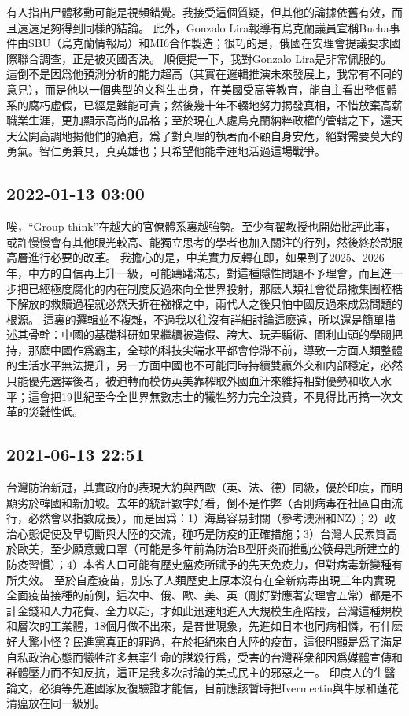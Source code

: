 \documentclass[twocolumn]{ctexart}
\begin{document}
有人指出尸體移動可能是視頻錯覺。我接受這個質疑，但其他的論據依舊有效，而且遠遠足夠得到同樣的結論。
此外，Gonzalo Lira報導有烏克蘭議員宣稱Bucha事件由SBU（烏克蘭情報局）和MI6合作製造；很巧的是，俄國在安理會提議要求國際聯合調查，正是被英國否決。
順便提一下，我對Gonzalo Lira是非常佩服的。這倒不是因爲他預測分析的能力超高（其實在邏輯推演未來發展上，我常有不同的意見），而是他以一個典型的文科生出身，在美國受高等教育，能自主看出整個體系的腐朽虛假，已經是難能可貴；然後幾十年不輟地努力揭發真相，不惜放棄高薪職業生涯，更加顯示高尚的品格；至於現在人處烏克蘭納粹政權的管轄之下，還天天公開高調地揭他們的瘡疤，爲了對真理的執著而不顧自身安危，絕對需要莫大的勇氣。智仁勇兼具，真英雄也；只希望他能幸運地活過這場戰爭。
\subsection*{2022-01-13 03:00}

唉，“Group think”在越大的官僚體系裏越強勢。至少有翟教授也開始批評此事，或許慢慢會有其他眼光較高、能獨立思考的學者也加入關注的行列，然後終於説服高層進行必要的改革。
我擔心的是，中美實力反轉在即，如果到了2025、2026年，中方的自信再上升一級，可能躊躇滿志，對這種隱性問題不予理會，而且進一步把已經極度腐化的内在制度反過來向全世界投射，那麽人類社會從昂撒集團桎梏下解放的救贖過程就必然夭折在襁褓之中，兩代人之後只怕中國反過來成爲問題的根源。
這裏的邏輯並不複雜，不過我以往沒有詳細討論這麽遠，所以還是簡單描述其骨幹：中國的基礎科研如果繼續被造假、誇大、玩弄騙術、圖利山頭的學閥把持，那麽中國作爲霸主，全球的科技尖端水平都會停滯不前，導致一方面人類整體的生活水平無法提升，另一方面中國也不可能同時持續雙贏外交和内部穩定，必然只能優先選擇後者，被迫轉而模仿英美靠榨取外國血汗來維持相對優勢和收入水平；這會把19世紀至今全世界無數志士的犧牲努力完全浪費，不見得比再搞一次文革的災難性低。
\subsection*{2021-06-13 22:51}

台灣防治新冠，其實政府的表現大約與西歐（英、法、德）同級，優於印度，而明顯劣於韓國和新加坡。去年的統計數字好看，倒不是作弊（否則病毒在社區自由流行，必然會以指數成長），而是因爲：1）海島容易封關（參考澳洲和NZ）；2）政治心態促使及早切斷與大陸的交流，碰巧是防疫的正確措施；3）台灣人民素質高於歐美，至少願意戴口罩（可能是多年前為防治B型肝炎而推動公筷母匙所建立的防疫習慣）；4）本省人口可能有歷史瘟疫所賦予的先天免疫力，但對病毒新變種有所失效。
至於自產疫苗，別忘了人類歷史上原本沒有在全新病毒出現三年内實現全面疫苗接種的前例，這次中、俄、歐、美、英（剛好對應著安理會五常）都是不計金錢和人力花費、全力以赴，才如此迅速地進入大規模生產階段，台灣這種規模和層次的工業體，18個月做不出來，是普世現象，先進如日本也同病相憐，有什麽好大驚小怪？民進黨真正的罪過，在於拒絕來自大陸的疫苗，這很明顯是爲了滿足自私政治心態而犧牲許多無辜生命的謀殺行爲，受害的台灣群衆卻因爲媒體宣傳和群體壓力而不知反抗，這正是我多次討論的美式民主的邪惡之一。
印度人的生醫論文，必須等先進國家反復驗證才能信，目前應該暫時把Ivermectin與牛尿和蓮花清瘟放在同一級別。
\end{document}
